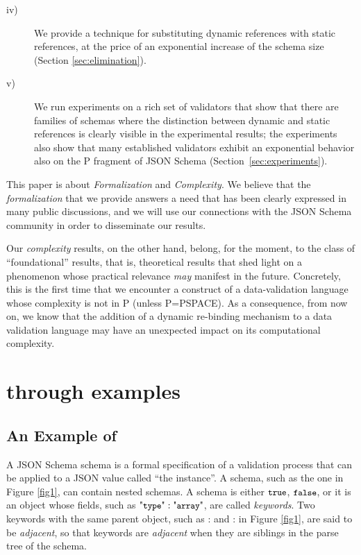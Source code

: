 \begin{description}
\item[iv)] We provide a technique for substituting dynamic references
with static references, at the price of an exponential increase of the schema size (Section \ref{sec:elimination}).

\item[v)] We run experiments on a rich set of validators that show that there are families of schemas where the distinction between dynamic and static references is clearly visible in the experimental results; the experiments also show that many established validators exhibit an exponential behavior also on the P fragment of JSON Schema (Section~\ref{sec:experiments}).
\end{description}


This paper is about \emph{Formalization} and \emph{Complexity}.
We believe that the \emph{formalization} that we provide answers a need that has been clearly expressed in many public discussions, and we will use our connections
with the JSON Schema community in order to disseminate our results.

Our \emph{complexity} results, on the other hand, belong, for the moment, to the class of ``foundational'' results, that is, theoretical results that shed light on a phenomenon whose practical relevance \emph{may} manifest in the future.
Concretely, this is the first time that we encounter a construct of a data-validation language whose complexity is not in P (unless P=PSPACE).
As a consequence, from now on, we know that the addition of a dynamic re-binding mechanism to a data validation language may
have an unexpected impact on its computational complexity.


\section{{\mJS} through examples}\label{sec:mjsintro}

\subsection{An Example of {\mJS}}


A JSON Schema schema %
is a formal specification of a validation process that can be applied to a JSON value called ``the
instance''. A schema, such as the one in Figure \ref{fig1}, can contain nested schemas.
A schema is either $\mbox{\tt{\small true}}$, $\mbox{\tt{\small false}}$, or it is an object whose fields, such as $\qtype: \qarray$, are called \emph{keywords}.
Two keywords with the same parent object, such as {\qdid} :  and {\qtype} : {\qobject} in Figure \ref{fig1}, are said to be \emph{adjacent}, so that keywords are \emph{adjacent} when they are siblings in the parse tree of the schema. 

